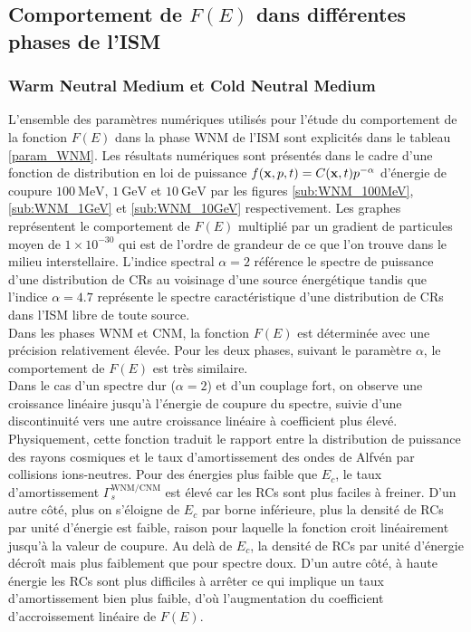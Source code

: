 \documentclass[10pt,a4paper]{article}
\begin{document}
\subsection*{Comportement de $F(E)$ dans différentes phases de l'ISM}

\subsubsection*{Warm Neutral Medium et Cold Neutral Medium}

L'ensemble des paramètres numériques utilisés pour l'étude du comportement de la fonction $F(E)$ dans la phase WNM de l'ISM sont explicités dans le tableau \ref{param_WNM}. Les résultats numériques sont présentés dans le cadre d'une fonction de distribution en loi de puissance $f(\vb{x}, p, t) = C(\vb{x}, t) p^{-\alpha}$ d'énergie de coupure $100~\mathrm{MeV}$, $1~\mathrm{GeV}$ et $10~\mathrm{GeV}$ par les figures \ref{sub:WNM_100MeV}, \ref{sub:WNM_1GeV} et \ref{sub:WNM_10GeV} respectivement. Les graphes représentent le comportement de $F(E)$ multiplié par un gradient de particules moyen de $1\times 10^{-30}$ qui est de l'ordre de grandeur de ce que l'on trouve dans le milieu interstellaire. L'indice spectral $\alpha = 2$ référence le spectre de puissance d'une distribution de CRs au voisinage d'une source énergétique tandis que l'indice $\alpha = 4.7$ représente le spectre caractéristique d'une distribution de CRs dans l'ISM libre de toute source.\\ 

Dans les phases WNM et CNM, la fonction $F(E)$ est déterminée avec une précision relativement élevée. Pour les deux phases, suivant le paramètre $\alpha$, le comportement de $F(E)$ est très similaire. \\ 

Dans le cas d'un spectre dur ($\alpha = 2$) et d'un couplage fort, on observe une croissance linéaire jusqu'à l'énergie de coupure du spectre, suivie d'une discontinuité vers une autre croissance linéaire à coefficient plus élevé. Physiquement, cette fonction traduit le rapport entre la distribution de puissance des rayons cosmiques et le taux d'amortissement des ondes de Alfvén par collisions ions-neutres. Pour des énergies plus faible que $E_c$, le taux d'amortissement $\Gamma^{\mathrm{WNM/CNM}}_{s}$ est élevé car les RCs sont plus faciles à freiner. D'un autre côté, plus on s'éloigne de $E_c$ par borne inférieure, plus la densité de RCs par unité d'énergie est faible, raison pour laquelle la fonction croit linéairement jusqu'à la valeur de coupure. Au delà de $E_c$, la densité de RCs par unité d'énergie décroît mais plus faiblement que pour spectre doux. D'un autre côté, à haute énergie les RCs sont plus difficiles à arrêter ce qui implique un taux d'amortissement bien plus faible, d'où l'augmentation du coefficient d'accroissement linéaire de $F(E)$. \\ 
\end{document}
